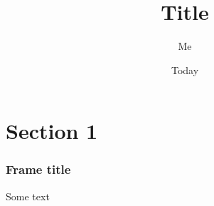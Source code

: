 \documentclass[xcolor=dvipsnames]{beamer}
\title{Title}
\author{Me}
\date{Today}
\begin{document}
  \section[My first section]{Section 1}
\begin{frame}
\frametitle{Frame title}
Some text
\end{frame}
\end{document}

